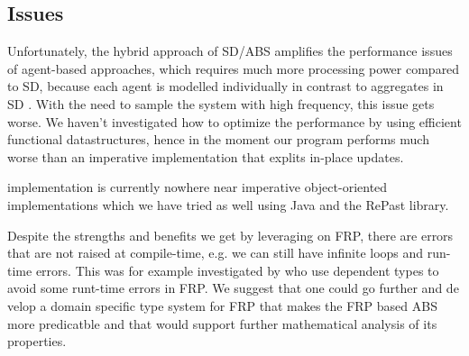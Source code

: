 \begin{comment}
Also we have built a full blown library for implementing pure agent-based simulations which implements and combines all the presented techniques including agent-transactions, event-scheduling and dynamic agent creation. As examples we implemented a number of well known agent-based models with various complexity, including the seminal and highly complex Sugarscape model \cite{epstein_growing_1996} and Schelling Segregation \cite{schelling_dynamic_1971} \footnote{The code is freely available at \url{https://github.com/thalerjonathan/chimera}}. Compared to object-oriented implementations, the pure functional ones are quite concise and highly expressive. This shows that from an engineering point-of-view a pure functional approach to ABS is as well suited as object-oriented techniques and we plan on releasing it on Hackage in the future.
\end{comment}

\subsection*{Issues}
Unfortunately, the hybrid approach of SD/ABS amplifies the performance issues of agent-based approaches, which requires much more processing power compared to SD, because each agent is modelled individually in contrast to aggregates in SD \cite{macal_agent-based_2010}. With the need to sample the system with high frequency, this issue gets worse. We haven't investigated how to optimize the performance by using efficient functional datastructures, hence in the moment our program performs much worse than an imperative implementation that explits in-place updates.

implementation is currently nowhere near imperative object-oriented implementations which we have tried as well using Java and the RePast library. 

Despite the strengths and benefits we get by leveraging on FRP, there are errors that are not raised at compile-time, e.g. we can still have infinite loops and run-time errors. This was for example investigated by \cite{sculthorpe_safe_2009} who use dependent types to avoid some runt-time errors in FRP. We suggest that one could go further and de velop a domain specific type system for FRP that makes the FRP based ABS more predicatble and that would support further mathematical analysis of its properties.



